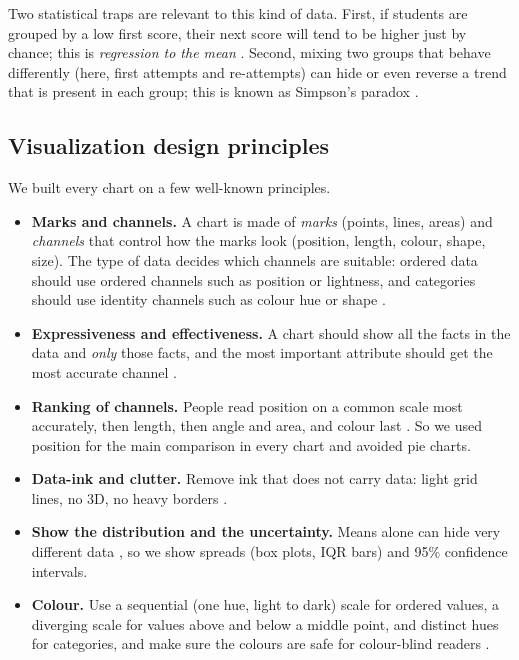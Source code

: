 \documentclass[11pt,a4paper]{article}
\begin{document}
Two statistical traps are relevant to this kind of data. First, if students
are grouped by a low first score, their next score will tend to be higher just
by chance; this is \emph{regression to the mean} \citep{barnett2005regression}.
Second, mixing two groups that behave differently (here, first attempts and
re-attempts) can hide or even reverse a trend that is present in each group;
this is known as Simpson's paradox \citep{simpson1951interpretation}.

\subsection{Visualization design principles}

We built every chart on a few well-known principles.

\begin{itemize}
  \item \textbf{Marks and channels.} A chart is made of \emph{marks} (points,
        lines, areas) and \emph{channels} that control how the marks look
        (position, length, colour, shape, size). The type of data decides which
        channels are suitable: ordered data should use ordered channels such as
        position or lightness, and categories should use identity channels such
        as colour hue or shape \citep{munzner2014visualization}.
  \item \textbf{Expressiveness and effectiveness.} A chart should show all the
        facts in the data and \emph{only} those facts, and the most important
        attribute should get the most accurate channel
        \citep{mackinlay1986automating}.
  \item \textbf{Ranking of channels.} People read position on a common scale
        most accurately, then length, then angle and area, and colour last
        \citep{cleveland1984graphical, heer2010crowdsourcing}. So we used
        position for the main comparison in every chart and avoided pie charts.
  \item \textbf{Data-ink and clutter.} Remove ink that does not carry data:
        light grid lines, no 3D, no heavy borders \citep{tufte2001visual}.
  \item \textbf{Show the distribution and the uncertainty.} Means alone can hide
        very different data \citep{weissgerber2015beyond}, so we show spreads
        (box plots, IQR bars) and 95\% confidence intervals.
  \item \textbf{Colour.} Use a sequential (one hue, light to dark) scale for
        ordered values, a diverging scale for values above and below a middle
        point, and distinct hues for categories, and make sure the colours are
        safe for colour-blind readers \citep{harrower2003colorbrewer}.
\end{itemize}
\end{document}
